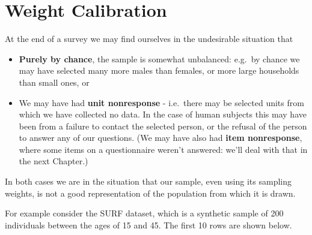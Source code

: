 \documentclass[
]{book}
\providecommand{\tightlist}{%
  \setlength{\itemsep}{0pt}\setlength{\parskip}{0pt}}
\begin{document}
\section{Weight Calibration}\label{weight-calibration}

At the end of a survey we may find ourselves in the undesirable situation that

\begin{itemize}
\tightlist
\item
  \textbf{Purely by chance}, the sample is somewhat unbalanced: e.g.~by chance we may have
  selected many more males than females, or more large households than small ones, or
\item
  We may have had \textbf{unit nonresponse} - i.e.~there may be selected units from
  which we have collected no data. In the case of human subjects this may have
  been from a failure to contact the selected person, or the refusal of the
  person to answer any of our questions. (We may have also had \textbf{item nonresponse},
  where some items on a questionnaire weren't answered: we'll deal with that
  in the next Chapter.)
\end{itemize}

In both cases we are in the situation that our sample, even using its sampling weights, is
not a good representation of the population from which it is drawn.

For example consider the SURF dataset, which is a synthetic sample of 200 individuals
between the ages of 15 and 45. The first 10 rows are shown below.
\end{document}
